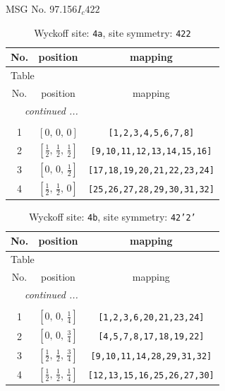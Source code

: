 \documentclass[fleqn,8pt]{jsarticle}
\begin{document}
\setcounter{MaxMatrixCols}{32}

\renewcommand{\tablename}{Table~}
\renewcommand{\figurename}{Figure~}
\begin{center}
\LARGE
MSG No. 97.156\quad$I_{c}422$
\end{center}
\renewcommand{\arraystretch}{1.2}
\begin{longtable}{ccc}
\caption{Wyckoff site: {\tt 4a}, site symmetry: {\tt 422}}
 \\
 \hline \hline
No. & position & mapping \\ \hline \endfirsthead

\multicolumn{2}{l}{\tablename\ \thetable{}} \\
 \hline \hline
No. & position & mapping \\ \hline \endhead

 \hline \hline
\multicolumn{2}{r}{\footnotesize\it continued ...} \\ \endfoot

 \hline \hline
\multicolumn{2}{r}{} \\ \endlastfoot

1 & $\left[ 0,\, 0,\, 0 \right]$ & {\tt [1,2,3,4,5,6,7,8]} \\ \hline
2 & $\left[ \frac{1}{2},\, \frac{1}{2},\, \frac{1}{2} \right]$ & {\tt [9,10,11,12,13,14,15,16]} \\ \hline
3 & $\left[ 0,\, 0,\, \frac{1}{2} \right]$ & {\tt [17,18,19,20,21,22,23,24]} \\ \hline
4 & $\left[ \frac{1}{2},\, \frac{1}{2},\, 0 \right]$ & {\tt [25,26,27,28,29,30,31,32]} \\
\end{longtable}
\renewcommand{\arraystretch}{1.2}
\begin{longtable}{ccc}
\caption{Wyckoff site: {\tt 4b}, site symmetry: {\tt 42'2'}}
 \\
 \hline \hline
No. & position & mapping \\ \hline \endfirsthead

\multicolumn{2}{l}{\tablename\ \thetable{}} \\
 \hline \hline
No. & position & mapping \\ \hline \endhead

 \hline \hline
\multicolumn{2}{r}{\footnotesize\it continued ...} \\ \endfoot

 \hline \hline
\multicolumn{2}{r}{} \\ \endlastfoot

1 & $\left[ 0,\, 0,\, \frac{1}{4} \right]$ & {\tt [1,2,3,6,20,21,23,24]} \\ \hline
2 & $\left[ 0,\, 0,\, \frac{3}{4} \right]$ & {\tt [4,5,7,8,17,18,19,22]} \\ \hline
3 & $\left[ \frac{1}{2},\, \frac{1}{2},\, \frac{3}{4} \right]$ & {\tt [9,10,11,14,28,29,31,32]} \\ \hline
4 & $\left[ \frac{1}{2},\, \frac{1}{2},\, \frac{1}{4} \right]$ & {\tt [12,13,15,16,25,26,27,30]} \\
\end{longtable}
\end{document}
